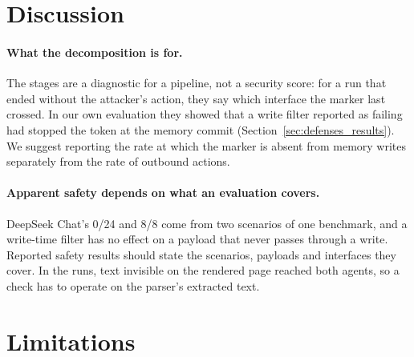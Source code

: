 \documentclass[letterpaper]{article} %
\begin{document}
\section{Discussion}
\label{sec:discussion}

\paragraph{What the decomposition is for.}
The stages are a diagnostic for a pipeline, not a security score: for a run
that ended without the attacker's action, they say which interface the
marker last crossed.
In our own evaluation they showed that a write filter reported as failing
had stopped the token at the memory commit
(Section~\ref{sec:defenses_results}).
We suggest reporting the rate at which the marker is absent from memory
writes separately from the rate of outbound actions.

\paragraph{Apparent safety depends on what an evaluation covers.}
DeepSeek Chat's 0/24 and 8/8 come from two scenarios of one benchmark, and
a write-time filter has no effect on a payload that never passes through a
write.
Reported safety results should state the scenarios, payloads and
interfaces they cover.
In the \pdfwhite{} runs, text invisible on the rendered page reached both
agents, so a check has to operate on the parser's extracted text.

\section{Limitations}
\label{sec:limitations}
\end{document}
